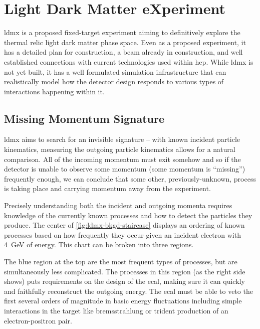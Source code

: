 \chapter{Light Dark Matter eXperiment}
\label{chapter:ldmx:experiment}

\ac{ldmx} is a proposed fixed-target experiment aiming to definitively explore
the thermal relic light dark matter phase space. Even as a proposed experiment, it has a detailed
plan for construction, a beam already in construction, and well established connections
with current technologies used within \ac{hep}. While \ac{ldmx} is not yet built,
it has a well formulated simulation infrastructure that can realistically model
how the detector design responds to various types of interactions happening within it.

\section{Missing Momentum Signature}
\ac{ldmx} aims to search for an invisible signature -- with known incident particle kinematics,
measuring the outgoing particle kinematics allows for a natural comparison. All of the incoming
momentum must exit somehow and so if the detector is unable to observe some momentum (some momentum
is ``missing'') frequently enough, we can conclude that some other, previously-unknown, process
is taking place and carrying momentum away from the experiment.

Precisely understanding both the incident and outgoing momenta requires knowledge of the currently
known processes and how to detect the particles they produce. The center of \cref{fig:ldmx-bkgd-staircase}
displays an ordering of known processes based on how frequently they occur given an incident electron 
with \qty{4}{\giga\electronvolt} of energy. This chart can be broken into three regions.

The blue region at the top are the most frequent types of processes,
but are simultaneously less complicated. The processes in this region (as the right side shows)
puts requirements on the design of the \ac{ecal}, making sure it can quickly and faithfully
reconstruct the outgoing energy.  The \ac{ecal} must be able to veto the first several
orders of magnitude in basic energy fluctuations including simple interactions in the
target like bremsstrahlung or trident production of an electron-positron pair.

